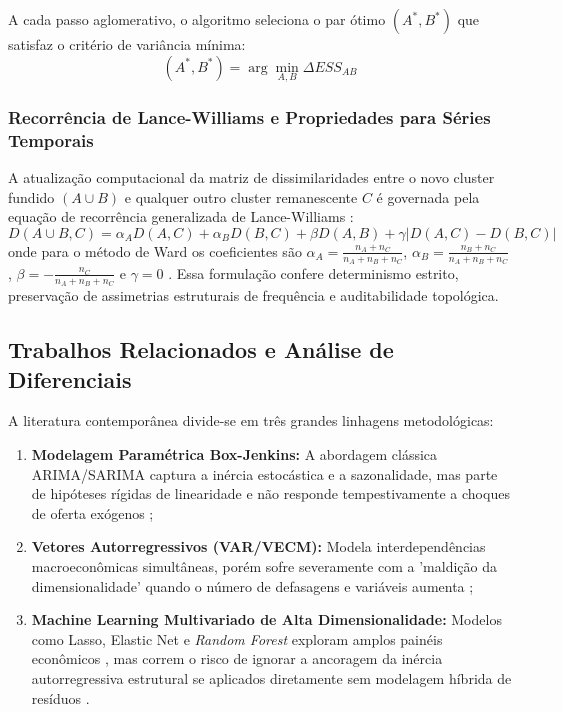 \documentclass[10pt,twoside]{article}
\begin{document}
A cada passo aglomerativo, o algoritmo seleciona o par ótimo $(A^*, B^*)$ que satisfaz o critério de variância mínima:
\begin{equation}
(A^*, B^*) = \arg\min_{A, B} \Delta ESS_{AB}
\end{equation}

\subsubsection{Recorrência de Lance-Williams e Propriedades para Séries Temporais}
A atualização computacional da matriz de dissimilaridades entre o novo cluster fundido $(A \cup B)$ e qualquer outro cluster remanescente $C$ é governada pela equação de recorrência generalizada de Lance-Williams \cite{ref20}:
\begin{equation}
D(A \cup B, C) = \alpha_A D(A, C) + \alpha_B D(B, C) + \beta D(A, B) + \gamma |D(A, C) - D(B, C)|
\end{equation}
onde para o método de Ward os coeficientes são $\alpha_A = \frac{n_A + n_C}{n_A + n_B + n_C}$, $\alpha_B = \frac{n_B + n_C}{n_A + n_B + n_C}$, $\beta = -\frac{n_C}{n_A + n_B + n_C}$ e $\gamma = 0$ \cite{ref7, ref20}. Essa formulação confere determinismo estrito, preservação de assimetrias estruturais de frequência e auditabilidade topológica.

\subsection{Trabalhos Relacionados e Análise de Diferenciais}
A literatura contemporânea divide-se em três grandes linhagens metodológicas:
\begin{enumerate}[leftmargin=1.5em]
    \item \textbf{Modelagem Paramétrica Box-Jenkins:} A abordagem clássica ARIMA/SARIMA captura a inércia estocástica e a sazonalidade, mas parte de hipóteses rígidas de linearidade e não responde tempestivamente a choques de oferta exógenos \cite{ref1, ref9};
    \item \textbf{Vetores Autorregressivos (VAR/VECM):} Modela interdependências macroeconômicas simultâneas, porém sofre severamente com a 'maldição da dimensionalidade' quando o número de defasagens e variáveis aumenta \cite{ref4};
    \item \textbf{Machine Learning Multivariado de Alta Dimensionalidade:} Modelos como Lasso, Elastic Net e \textit{Random Forest} exploram amplos painéis econômicos \cite{ref6, ref14}, mas correm o risco de ignorar a ancoragem da inércia autorregressiva estrutural se aplicados diretamente sem modelagem híbrida de resíduos \cite{ref6, ref14, ref18}.
\end{enumerate}
\end{document}
